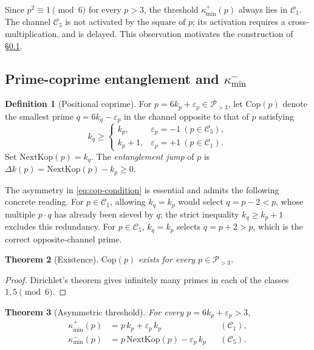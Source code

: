\documentclass[11pt]{amsart}
\numberwithin{equation}{section}
\newcommand{\cP}{\mathcal{P}}
\newcommand{\kminp}{\kappa_{\min}^{+}}
\newcommand{\kminm}{\kappa_{\min}^{-}}
\newcommand{\Cone}{\mathcal{C}_1}
\newcommand{\Cfive}{\mathcal{C}_5}
\newcommand{\NextKop}{\mathrm{NextKop}}
\newcommand{\Cop}{\mathrm{Cop}}
\theoremstyle{plain}
\newtheorem{theorem}{Theorem}[section]
\theoremstyle{definition}
\newtheorem{definition}[theorem]{Definition}
\begin{document}
Since $p^2\equiv 1\pmod 6$ for every $p>3$, the threshold $\kminp(p)$
always lies in $\Cone$. The channel $\Cfive$ is not activated by the
square of $p$; its activation requires a cross-multiplication, and is
delayed. This observation motivates the construction of
\S\ref{subsec:entanglement}.

\subsection{Prime-coprime entanglement and \texorpdfstring{$\kminm$}{k\_min-}}
\label{subsec:entanglement}

\begin{definition}[Positional coprime]
\label{def:cop}
For $p=6k_p+\varepsilon_p\in\cP_{>3}$, let $\Cop(p)$ denote the
smallest prime $q=6k_q-\varepsilon_p$ in the channel opposite to that
of $p$ satisfying
\begin{equation}
k_q\ge
\begin{cases}
k_p, & \varepsilon_p=-1\ (p\in\Cfive),\\
k_p+1, & \varepsilon_p=+1\ (p\in\Cone).
\end{cases}
\label{eq:cop-condition}
\end{equation}
Set $\NextKop(p)=k_q$. The \emph{entanglement jump} of $p$ is
$\Delta k(p)=\NextKop(p)-k_p\ge 0$.
\end{definition}

The asymmetry in \eqref{eq:cop-condition} is essential and admits the
following concrete reading. For $p\in\Cone$, allowing $k_q=k_p$ would
select $q=p-2<p$, whose multiple $p\cdot q$ has already been sieved
by $q$; the strict inequality $k_q\ge k_p+1$ excludes this redundancy.
For $p\in\Cfive$, $k_q=k_p$ selects $q=p+2>p$, which is the correct
opposite-channel prime.

\begin{theorem}[Existence]
\label{thm:existence}
$\Cop(p)$ exists for every $p\in\cP_{>3}$.
\end{theorem}

\begin{proof}
Dirichlet's theorem gives infinitely many primes in each of the
classes $1,5\pmod 6$.
\end{proof}

\begin{theorem}[Asymmetric threshold]
\label{thm:kmin_pm}
For every $p=6k_p+\varepsilon_p>3$,
\begin{align}
\kminp(p)&=p\,k_p+\varepsilon_p\,k_p
&&(\Cone),\label{eq:kminp-thm}\\
\kminm(p)&=p\,\NextKop(p)-\varepsilon_p\,k_p
&&(\Cfive).\label{eq:kminm-thm}
\end{align}
\end{theorem}
\end{document}
